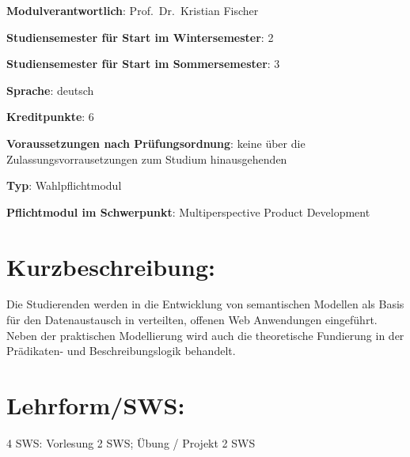 \begin{modulHead}
\textbf{Modulverantwortlich}: Prof.~Dr.~Kristian
Fischer
\end{modulHead}
\begin{modulHead}
\textbf{Studiensemester für
Start im Wintersemester}:
2
\end{modulHead}
\begin{modulHead}
\textbf{Studiensemester für Start
im Sommersemester}:
3
\end{modulHead}
\begin{modulHead}
\textbf{Sprache}:
deutsch
\end{modulHead}
\begin{modulHead}
\textbf{Kreditpunkte}:
6
\end{modulHead}
\begin{modulHead}
\textbf{Voraussetzungen nach
Prüfungsordnung}: keine über die Zulassungsvorrausetzungen zum Studium
hinausgehenden
\end{modulHead}
\begin{modulHead}
\textbf{Typ}:
Wahlpflichtmodul
\end{modulHead}
\begin{modulHead}
\textbf{Pflichtmodul
im Schwerpunkt}: Multiperspective Product Development
\end{modulHead}


\section*{Kurzbeschreibung:\label{/mi-2017/modulbeschreibungen-master/MA_WTW_Modul_Logik-und-semantische-Modellierung}}\label{kurzbeschreibungpathlabelmi-2017modulbeschreibungen-mastermaux5fwtwux5fmodulux5flogik-und-semantische-modellierung}

Die Studierenden werden in die Entwicklung von semantischen Modellen als
Basis für den Datenaustausch in verteilten, offenen Web Anwendungen
eingeführt. Neben der praktischen Modellierung wird auch die
theoretische Fundierung in der Prädikaten- und Beschreibungslogik
behandelt.

\section*{Lehrform/SWS:\label{/mi-2017/modulbeschreibungen-master/MA_WTW_Modul_Logik-und-semantische-Modellierung}}\label{lehrformswspathlabelmi-2017modulbeschreibungen-mastermaux5fwtwux5fmodulux5flogik-und-semantische-modellierung}

4 SWS: Vorlesung 2 SWS; Übung / Projekt 2 SWS

